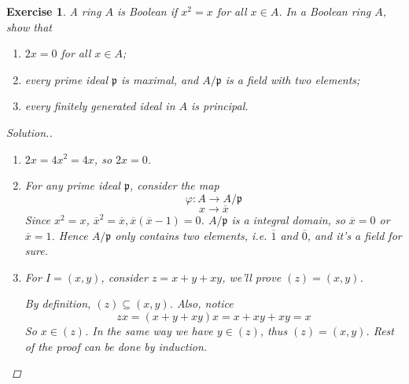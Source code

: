 \documentclass{article}
\theoremstyle{breakstyle}
\newtheorem{exercise}{Exercise}
\newenvironment{solution}
  {\begin{proof}[Solution.]\renewcommand{\qedsymbol}{}}
  {\end{proof}}
\begin{document}
\begin{exercise}
A ring \(A\) is Boolean if \(x^2=x\) for all \(x\in A\). In a Boolean ring \(A\), show that
\begin{enumerate}[label=(\roman*)]
    \item \(2x=0\) for all \(x\in A\);
    \item every prime ideal \(\mathfrak p\) is maximal, and \(A/\mathfrak p\) is a field with two elements;
    \item every finitely generated ideal in \(A\) is principal.
\end{enumerate}

\begin{solution}
    \begin{enumerate}[label=({\roman*})]
            \item $2x=4x^2=4x$, so $2x=0$.
            \item For any prime ideal $\mathfrak{p}$, consider the map
                $$
                \varphi:A\longrightarrow A / \mathfrak{p}
                $$
                $$
                x\longrightarrow \overline{x}
                $$
                Since $x^2=x$, $\overline{x}^2=\overline{x},\overline{x}(\overline{x}-1)=0$.
                $A / \mathfrak{p}$ is a integral domain, so $\overline{x}=0$ or $\overline{x}=1$.
                Hence $A / \mathfrak{p}$ only contains two elements, i.e. $\overline{1}$ and $\overline{0}$, and it's a field for sure.
            \item For $I=(x,y)$, consider $z=x+y+xy$, we'll prove $(z)=(x,y)$.

                By definition, $(z)\subseteq (x,y)$.
                Also, notice
                $$
                zx=(x+y+xy)x=x+xy+xy=x
                $$
                So $x\in (z)$.
                In the same way we have $y\in (z)$,
                thus $(z)=(x,y)$.
                Rest of the proof can be done by induction.
        \end{enumerate}
\end{solution}
\end{exercise}
\end{document}
